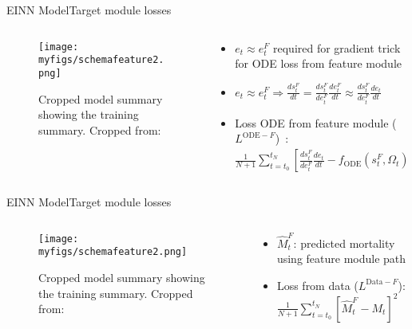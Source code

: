 \documentclass[
	aspectratio=169,	%
	onlytextwidth,		%
	t,					%
	]{beamer}
\begin{document}
\begin{frame}[fragile]{EINN Model}{Target module losses}
	\begin{columns}
		
		\begin{column}[T]{.5\textwidth}
			\begin{figure}
				\texttt{[image: myfigs/schemafeature2.png]}
				\caption{Cropped model summary showing the training summary. Cropped from:~\cite{main}}
			\end{figure}
		\end{column}
		
		\begin{column}[T]{.5\textwidth}
			\begin{itemize}
				\item<1-> $e_{t}\approx e_{t}^{F}$ required for gradient trick for ODE loss from feature module
				\item<2-> $e_{t} \approx e_{t}^{F} \Rightarrow \frac{ds_{t}^{F}}{dt} = \frac{ds_{t}^{F}}{de_{t}^{F}} \frac{de_{t}^{F}}{dt} \approx \frac{ds_{t}^{F}}{de_{t}^{F}} \frac{de_{t}}{dt} $ 
				\item<3-> Loss ODE from feature module ($L^{\text{ODE}-F}$)~\cite{main}: $\frac{1}{N+1}\sum_{t=t_{0}}^{t_{N}} \left[ \frac{ds_{t}^{F}}{de_{t}^{F}}\frac{de_{t}}{dt} - f_{\text{ODE}}(s_{t}^{F}, \Omega_{t}) \right] ^{2} $
			\end{itemize}
		\end{column}
			
\end{columns}
\end{frame}

\begin{frame}[fragile]{EINN Model}{Target module losses}
	\begin{columns}
		
		\begin{column}[T]{.5\textwidth}
			\begin{figure}
				\texttt{[image: myfigs/schemafeature2.png]}
				\caption{Cropped model summary showing the training summary. Cropped from:~\cite{main}}
			\end{figure}
		\end{column}
		
		\begin{column}[T]{.5\textwidth}
			\begin{itemize}
				\item<1-> $\hat{M}_{t}^{F}$: predicted mortality using feature module path
				\item<2-> Loss from data ($L^{\text{Data}-F}$): $\frac{1}{N+1}\sum_{t=t_{0}}^{t_{N}}\left[ \hat{M}_{t}^{F} - M_{t}\right]^{2}$   
			\end{itemize}
		\end{column}
			
\end{columns}
\end{frame}
\end{document}
